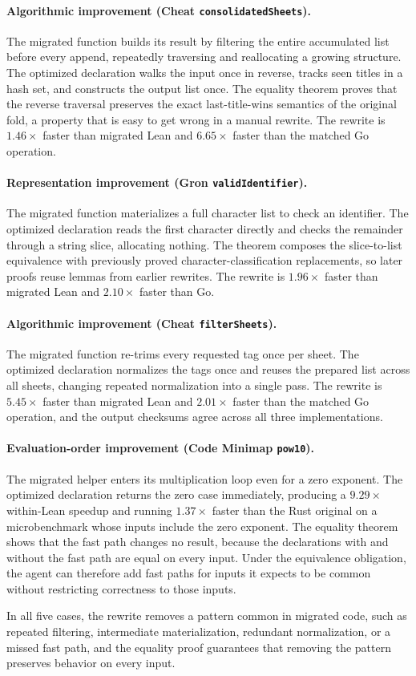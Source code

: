 \paragraph{Algorithmic improvement (Cheat \texttt{consolidatedSheets}).}
The migrated function builds its result by filtering the entire accumulated list before every append, repeatedly traversing and reallocating a growing structure.
The optimized declaration walks the input once in reverse, tracks seen titles in a hash set, and constructs the output list once.
The equality theorem proves that the reverse traversal preserves the exact last-title-wins semantics of the original fold, a property that is easy to get wrong in a manual rewrite.
The rewrite is $1.46\times$ faster than migrated Lean and $6.65\times$ faster than the matched Go operation.

\paragraph{Representation improvement (Gron \texttt{validIdentifier}).}
The migrated function materializes a full character list to check an identifier.
The optimized declaration reads the first character directly and checks the remainder through a string slice, allocating nothing.
The theorem composes the slice-to-list equivalence with previously proved character-classification replacements, so later proofs reuse lemmas from earlier rewrites.
The rewrite is $1.96\times$ faster than migrated Lean and $2.10\times$ faster than Go.

\paragraph{Algorithmic improvement (Cheat \texttt{filterSheets}).}
The migrated function re-trims every requested tag once per sheet.
The optimized declaration normalizes the tags once and reuses the prepared list across all sheets, changing repeated normalization into a single pass.
The rewrite is $5.45\times$ faster than migrated Lean and $2.01\times$ faster than the matched Go operation, and the output checksums agree across all three implementations.

\paragraph{Evaluation-order improvement (Code Minimap \texttt{pow10}).}
The migrated helper enters its multiplication loop even for a zero exponent.
The optimized declaration returns the zero case immediately, producing a $9.29\times$ within-Lean speedup and running $1.37\times$ faster than the Rust original on a microbenchmark whose inputs include the zero exponent.
The equality theorem shows that the fast path changes no result, because the declarations with and without the fast path are equal on every input.
Under the equivalence obligation, the agent can therefore add fast paths for inputs it expects to be common without restricting correctness to those inputs.

In all five cases, the rewrite removes a pattern common in migrated code, such as repeated filtering, intermediate materialization, redundant normalization, or a missed fast path, and the equality proof guarantees that removing the pattern preserves behavior on every input.
